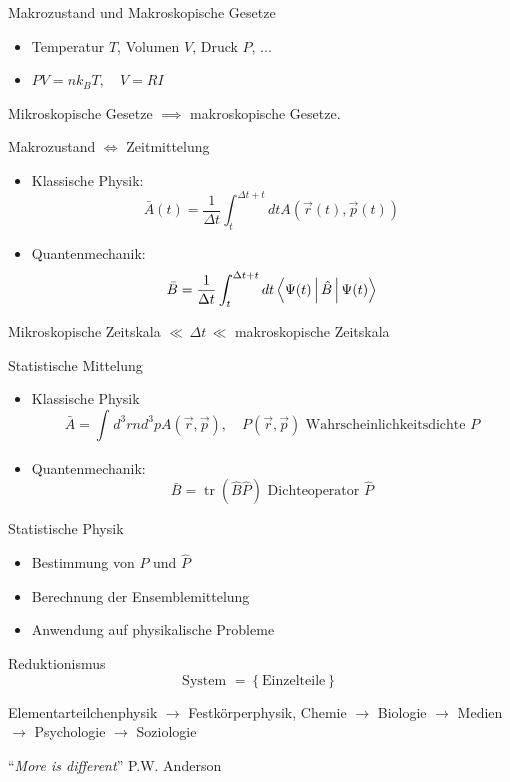 \documentclass[11pt]{article}
\theoremstyle{plain}
\newcommand{\trace}{\operatorname{tr}}
\begin{document}
\begin{description}
  \item Makrozustand und Makroskopische Gesetze
    \begin{itemize}
      \item Temperatur $T$, Volumen $V$, Druck $P$, ...
      \item $P V=nk_BT, \quad V=RI$
    \end{itemize}
  \item Mikroskopische Gesetze $\implies $ makroskopische Gesetze.
  \item Makrozustand $\iff $ Zeitmittelung
    \begin{itemize}
      \item Klassische Physik: \[ \bar{A}(t)= \frac{1}{\Delta t} \int_{t}^{\Delta t +t} dt
        A(\vec{r}(t),\vec{p}(t))\] 
      \item Quantenmechanik: \[ \bar{B} = \frac{1}{\Delta t} \int_{t}^{\Delta t+t} dt
        \Braket{\Psi(t) | \hat{B} | \Psi (t)}\] 
    \end{itemize}
  \item Mikroskopische Zeitskala $\ll\, \Delta t \, \ll$ makroskopische Zeitskala
  \item Statistische Mittelung
    \begin{itemize}
      \item Klassische Physik \[ \bar{A} = \int_{}^{} d^3r n d^3p A(\vec{r}, \vec{p}),
        \quad P(\vec{r}, \vec{p}) \text{ Wahrscheinlichkeitsdichte } P \] 
      \item Quantenmechanik: \[ \bar{B}= \trace(\hat{B} \hat{P})
          \text{ Dichteoperator } \hat{P} \]   
    \end{itemize}
  \item Statistische Physik
    \begin{itemize}
      \item Bestimmung von $P$ und $\hat{P}$
      \item Berechnung der Ensemblemittelung
      \item Anwendung auf physikalische Probleme
    \end{itemize}
  \item Reduktionismus \[ \text{System } = \left\{ \text{Einzelteile} \right\} \] 
  \item Elementarteilchenphysik $\to $ Festk\"orperphysik, Chemie $\to $
    Biologie $\to $ Medien $\to $ Psychologie $\to $ Soziologie
  \item ``\emph{More is different}'' P.W. Anderson
    
\end{description}
\end{document}
